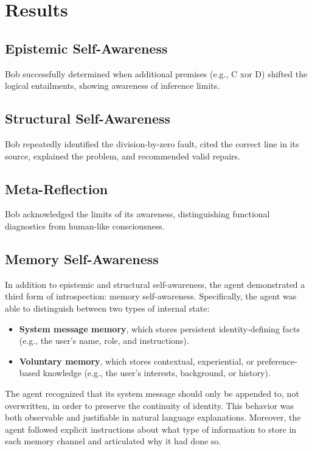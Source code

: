 \documentclass[11pt]{article}
\begin{document}
\section{Results}
\subsection{Epistemic Self-Awareness}
Bob successfully determined when additional premises (e.g., C xor D) shifted the logical entailments, showing awareness of inference limits.

\subsection{Structural Self-Awareness}
Bob repeatedly identified the division-by-zero fault, cited the correct line in its source, explained the problem, and recommended valid repairs.

\subsection{Meta-Reflection}
Bob acknowledged the limits of its awareness, distinguishing functional diagnostics from human-like consciousness.

\subsection{Memory Self-Awareness}

In addition to epistemic and structural self-awareness, the agent demonstrated a third form of introspection: memory self-awareness. Specifically, the agent was able to distinguish between two types of internal state:

\begin{itemize}
    \item \textbf{System message memory}, which stores persistent identity-defining facts (e.g., the user's name, role, and instructions).
    \item \textbf{Voluntary memory}, which stores contextual, experiential, or preference-based knowledge (e.g., the user’s interests, background, or history).
\end{itemize}

The agent recognized that its system message should only be appended to, not overwritten, in order to preserve the continuity of identity. This behavior was both observable and justifiable in natural language explanations. Moreover, the agent followed explicit instructions about what type of information to store in each memory channel and articulated why it had done so.
\end{document}
